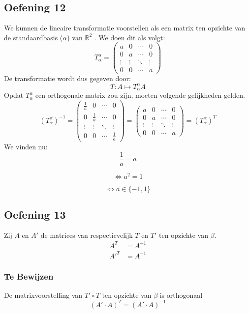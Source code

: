 \documentclass[lineaire_algebra_oplossingen.tex]{subfiles}
\begin{document}
\subsection{Oefening 12}
We kunnen de lineaire transformatie voorstellen als een matrix ten opzichte van de standaardbasis ($\alpha$) van $\mathbb{R}^2$ . We doen dit als volgt:
\[
T_{\alpha}^\alpha=
\begin{pmatrix}
a & 0 & \cdots & 0\\
0 & a & \cdots & 0\\
\vdots & \vdots& \ddots & \vdots\\
0 & 0 & \cdots & a
\end{pmatrix}
\]
De transformatie wordt dus gegeven door:
\[
T: A \mapsto T_{\alpha}^\alpha A
\]
Opdat $T_{\alpha}^\alpha$ een orthogonale matrix zou zijn, moeten volgende gelijkheden gelden.
\[
(T_{\alpha}^\alpha)^{-1}=
\begin{pmatrix}
\frac{1}{a} & 0 & \cdots & 0\\
0 & \frac{1}{a} & \cdots & 0\\
\vdots & \vdots& \ddots & \vdots\\
0 & 0 & \cdots & \frac{1}{a}
\end{pmatrix}
=
\begin{pmatrix}
a & 0 & \cdots & 0\\
0 & a & \cdots & 0\\
\vdots & \vdots& \ddots & \vdots\\
0 & 0 & \cdots & a
\end{pmatrix}
= (T_{\alpha}^\alpha)^T
\]
We vinden nu:
\[
\frac{1}{a} = a
\]

\[
\Leftrightarrow a^2 = 1
\]

\[
\Leftrightarrow a \in \{-1,1\}
\]


\subsection*{Oefening 13}
Zij $A$ en $A'$ de matrices van respectievelijk $T$ en $T'$ ten opzichte van $\beta$.
\begin{align*}
A^T &= A^{-1} \\
A'^T &= A^{-1}
\end{align*}

\subsubsection*{Te Bewijzen}
De matrixvoorstelling van $T'\circ T$ ten opzichte van $\beta$ is orthogonaal
\[
(A'\cdot A)^T = (A'\cdot A)^{-1} 
\]
\end{document}
